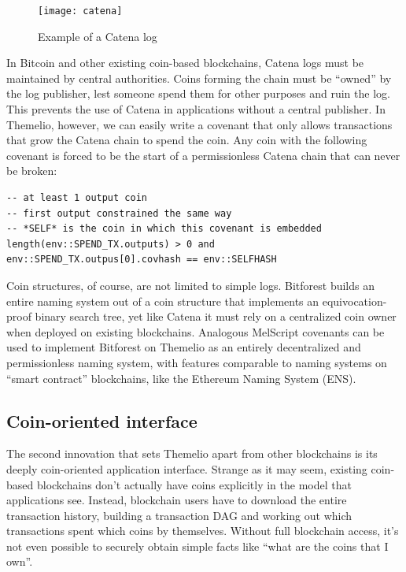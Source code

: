 \documentclass[headinclude,12pt]{scrbook}
\begin{document}
\begin{figure}
    \centering \texttt{[image: catena]}
    \caption{Example of a Catena log}
    \label{fig:catena}
\end{figure}

In Bitcoin and other existing coin-based blockchains, Catena logs must be maintained by central authorities. Coins forming the chain must be ``owned'' by the log publisher, lest someone spend them for other purposes and ruin the log. This prevents the use of Catena in applications without a central publisher. In Themelio, however, we can easily write a covenant that only allows transactions that grow the Catena chain to spend the coin. Any coin with the following covenant is forced to be the start of a permissionless Catena chain that can never be broken:
\begin{lstlisting}
-- at least 1 output coin
-- first output constrained the same way
-- *SELF* is the coin in which this covenant is embedded
length(env::SPEND_TX.outputs) > 0 and 
env::SPEND_TX.outpus[0].covhash == env::SELFHASH
\end{lstlisting}

Coin structures, of course, are not limited to simple logs. Bitforest \cite{dong2018bitforest} builds an entire naming system out of a coin structure that implements an equivocation-proof binary search tree, yet like Catena it must rely on a centralized coin owner when deployed on existing blockchains. Analogous MelScript covenants can be used to implement Bitforest on Themelio as an entirely decentralized and permissionless naming system, with features comparable to naming systems on ``smart contract'' blockchains, like the Ethereum Naming System (ENS).

\subsection{Coin-oriented interface}

The second innovation that sets Themelio apart from other blockchains is its deeply coin-oriented application interface. Strange as it may seem, existing coin-based blockchains don't actually have coins explicitly in the model that applications see. Instead, blockchain users have to download the entire transaction history, building a transaction DAG and working out which transactions spent which coins by themselves. Without full blockchain access, it's not even possible to securely obtain simple facts like ``what are the coins that I own''.
\end{document}
